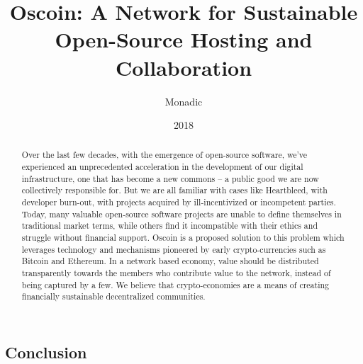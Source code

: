 \documentclass[a4paper, 9pt, draft]{amsart}
\title[Oscoin]{Oscoin: A Network for Sustainable Open-Source Hosting and Collaboration}
\author{Monadic}
\date{2018}
\begin{document}
\begin{abstract}
    Over the last few decades, with the emergence of open-source software,
    we've experienced an unprecedented acceleration in the development of our
    digital infrastructure, one that has become a new commons -- a public good
    we are now collectively responsible for. But we are all familiar with cases
    like Heartbleed, with developer burn-out, with projects acquired by
    ill-incentivized or incompetent parties. Today, many valuable open-source
    software projects are unable to define themselves in traditional market
    terms, while others find it incompatible with their ethics and struggle
    without financial support. Oscoin is a proposed solution to this problem
    which leverages technology and mechanisms pioneered by early
    crypto-currencies such as Bitcoin and Ethereum.  In a network based
    economy, value should be distributed transparently towards the members who
    contribute value to the network, instead of being captured by a few.  We
    believe that crypto-economies are a means of creating financially
    sustainable decentralized communities.
\end{abstract}
\maketitle

\setlength{\columnsep}{20pt}
\begin{multicols}{2}















\section{Conclusion}

\end{multicols}

\appendix
\end{document}
